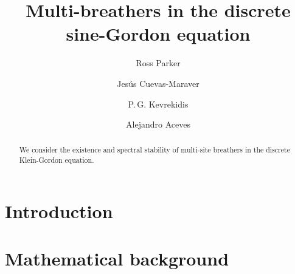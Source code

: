 \documentclass[12pt,reqno]{amsart}
\begin{document}
\title{Multi-breathers in the discrete sine-Gordon equation}

\author{Ross Parker}
\address{Department of Mathematics, Southern Methodist University, 
Dallas, TX 75275, USA}

\author{Jes\'us Cuevas-Maraver}
\address{Grupo de F\'{\i}sica No Lineal, Departamento de F\'{\i}sica Aplicada I,
Universidad de Sevilla. Escuela Polit\'{e}cnica Superior, C/ Virgen de Africa, 7, 41011-Sevilla, Spain}
\address{Instituto de Matem\'{a}ticas de la Universidad de Sevilla (IMUS). Edificio
Celestino Mutis. Avda. Reina Mercedes s/n, 41012-Sevilla, Spain, Avda Reina Mercedes s/n, E-41012 Sevilla, Spain}

\author{P.\,G. Kevrekidis} 
\address{Department of Mathematics and Statistics, University of Massachusetts, Amherst MA 01003, USA}

\author{Alejandro Aceves}
\address{Department of Mathematics, Southern Methodist University, 
Dallas, TX 75275, USA}

\begin{abstract}
	We consider the existence and spectral stability of multi-site breathers in the discrete Klein-Gordon equation.
\end{abstract}

\maketitle

\section{Introduction}

\section{Mathematical background}\label{sec:bg}
\end{document}
